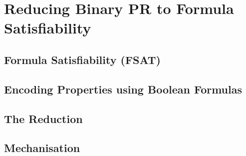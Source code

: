 \chapter{Reducing Binary PR to Formula Satisfiability}

\section{Formula Satisfiability (FSAT)}

\section{Encoding Properties using Boolean Formulas}

\section{The Reduction}

\section{Mechanisation}
